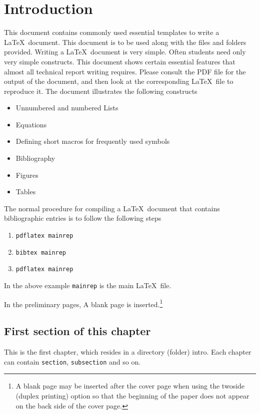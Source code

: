 
\newcommand{\etas}{\ensuremath{\eta_{\mathrm{s}}}}

\chapter{Introduction}
\label{ch1-Introduction}


This document contains commonly used essential templates to write a
\LaTeX\ document. This document is to be used along with the files and
folders provided. Writing a \LaTeX\ document is very simple.  Often
students need only very simple constructs.  This document shows
certain essential features that almost all technical report writing
requires. Please consult the PDF file for the output of the document,
and then look at the corresponding \LaTeX\ file to reproduce it.  The
document illustrates the following constructs
\begin{itemize}
\item Unnumbered and numbered Lists
\item Equations
\item Defining short macros for frequently used symbols
\item Bibliography
\item Figures
\item Tables
\end{itemize}

The normal procedure for compiling a \LaTeX\ document that contains
bibliographic entries is to follow the following steps
\begin{enumerate}
\item \verb|pdflatex mainrep|
\item \verb|bibtex mainrep|
\item \verb|pdflatex mainrep|
\end{enumerate}
In the above example \verb|mainrep| is the main \LaTeX\ file.

In the preliminary pages, A blank page is inserted.\footnote{A blank page may be inserted after the cover page when using the twoside
(duplex printing) option so that the beginning of the paper does not appear
on the back side of the cover page.}

\section{First section of this chapter}

This is the first chapter, which resides in a directory (folder)
intro. Each chapter can contain \verb|section|, \verb|subsection|
and so on.

